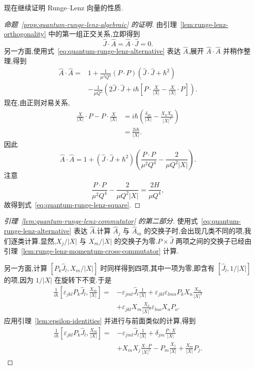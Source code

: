 {现在继续证明 Runge--Lenz 向量的性质.

\begin{proof}[命题~\ref{prop:quantum-runge-lenz-algebraic} 的证明]
由引理~\ref{lem:runge-lenz-orthogonality} 中的第一组正交关系,立即得到
\[
 \widehat J\cdot\widehat A=\widehat A\cdot\widehat J=0.
\]
另一方面,使用式~\eqref{eq:quantum-runge-lenz-alternative} 表达 $\widehat A$,展开 $\widehat A\cdot\widehat A$ 并稍作整理,得到
\[
\begin{aligned}
 \widehat A\cdot\widehat A
 ={}&1+\frac1{\mu^2Q^4}(P\cdot P)(\widehat J\cdot\widehat J+\hbar^2)\\
 &-\frac1{\mu Q^2}\left(2\widehat J\cdot\widehat J
 +i\hbar\left[P\cdot\frac{X}{|X|}-\frac{X}{|X|}\cdot P\right]\right).
\end{aligned}
\]
现在,由正则对易关系,
\[
\begin{aligned}
 \frac{X}{|X|}\cdot P-P\cdot\frac{X}{|X|}
 &=i\hbar\left(\frac{\delta_{kk}}{|X|}-\frac{X_kX_k}{|X|^3}\right)\\
 &=\frac{2i\hbar}{|X|}.
\end{aligned}
\]
因此
\[
 \widehat A\cdot\widehat A
 =1+(\widehat J\cdot\widehat J+\hbar^2)
 \left(\frac{P\cdot P}{\mu^2Q^4}-\frac{2}{\mu Q^2|X|}\right).
\]
注意
\[
 \frac{P\cdot P}{\mu^2Q^4}-\frac{2}{\mu Q^2|X|}
 =\frac{2\widehat H}{\mu Q^4},
\]
故得到式~\eqref{eq:quantum-runge-lenz-square}.
\end{proof}

\begin{proof}[引理~\ref{lem:quantum-runge-lenz-commutator} 的第二部分]
使用式~\eqref{eq:quantum-runge-lenz-alternative} 表达 $\widehat A$.计算 $\widehat A_j$ 与 $\widehat A_m$ 的交换子时,会出现几类不同的项,我们逐类计算.显然,$X_j/|X|$ 与 $X_m/|X|$ 的交换子为零.$P\times\widehat J$ 两项之间的交换子已经由引理~\ref{lem:runge-lenz-momentum-cross-commutator} 计算.

另一方面,计算 $[P_k\widehat J_l,X_m/|X|]$ 时同样得到四项,其中一项为零,即含有 $[\widehat J_l,1/|X|]$ 的项,因为 $1/|X|$ 在旋转下不变.于是
\[
\begin{aligned}
 \frac1{i\hbar}\left[\varepsilon_{jkl}P_k\widehat J_l,\frac{X_m}{|X|}\right]
 ={}&-\varepsilon_{jml}\widehat J_l\frac1{|X|}
 +\varepsilon_{jkl}\varepsilon_{lmn}P_kX_n\frac{X_m}{|X|^3}\\
 &+\varepsilon_{jkl}X_m\frac{X_k}{|X|^3}\varepsilon_{lno}X_nP_o.
\end{aligned}
\]
应用引理~\ref{lem:epsilon-identities} 并进行与前面类似的计算,得到
\[
\begin{aligned}
 \frac1{i\hbar}\left[\varepsilon_{jkl}P_k\widehat J_l,\frac{X_m}{|X|}\right]
 ={}&-\varepsilon_{jml}\widehat J_l\frac1{|X|}
 +\delta_{jm}\frac{P\cdot X}{|X|}\\
 &+X_mX_j\frac{X\cdot P}{|X|^5}
 -P_m\frac{X_j}{|X|}+\frac{X_m}{|X|}P_j.
\end{aligned}
\label{eq:runge-lenz-cross-position-commutator}
\]


\end{proof}}

